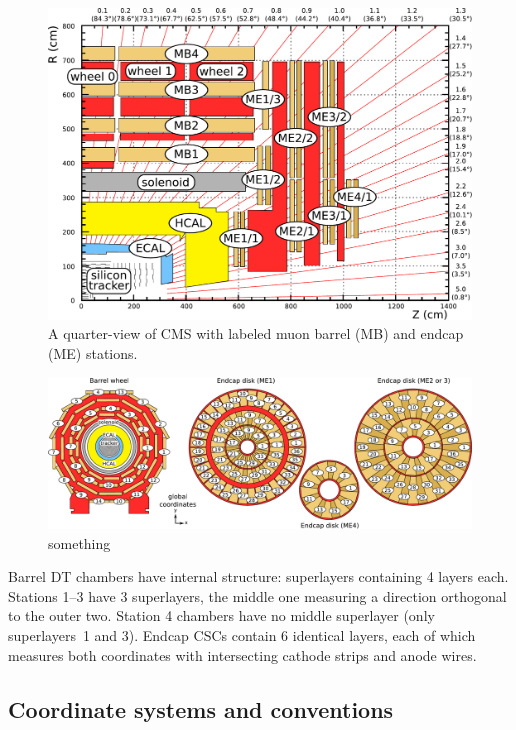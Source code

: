 \begin{figure}[p]
\includegraphics[width=\linewidth]{plots/intro_geom/muon_system_labeled2.pdf}

\caption{A quarter-view of CMS with labeled muon barrel (MB) and endcap (ME) stations. \label{fig:muon_system_labeled}}
\end{figure}

\begin{figure}[p]
\includegraphics[width=\linewidth]{plots/intro_geom/muoneverything.pdf}

\caption{something \label{fig:muoneverything}}
\end{figure}

Barrel DT chambers have internal structure: superlayers
containing 4 layers each.  Stations 1--3 have 3 superlayers, the
middle one measuring a direction orthogonal to the outer
two.  Station 4 chambers have no middle superlayer (only superlayers~1
and 3).  Endcap CSCs contain 6 identical layers, each of which
measures both coordinates with intersecting cathode strips and anode
wires.

\subsection{Coordinate systems and conventions}

